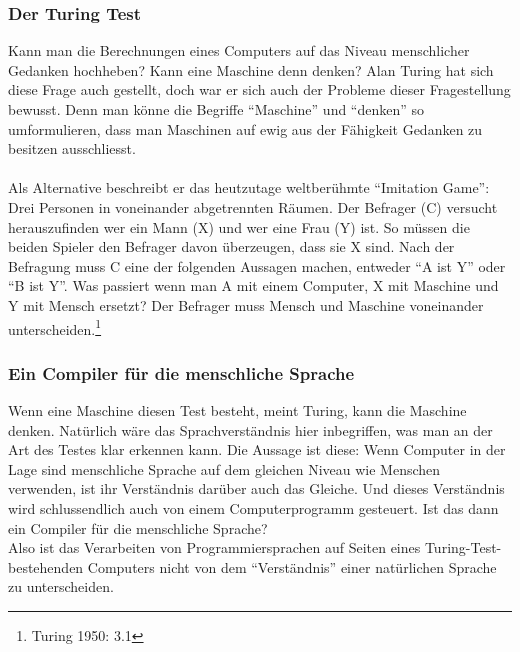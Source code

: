 \documentclass[10pt,a4paper]{article}
\begin{document}
\subsubsection{Der Turing Test}
Kann man die Berechnungen eines Computers auf das Niveau menschlicher Gedanken hochheben? Kann eine Maschine denn denken? Alan Turing hat sich diese Frage auch gestellt, doch war er sich auch der Probleme dieser Fragestellung bewusst. Denn man könne die Begriffe \enquote{Maschine} und \enquote{denken} so umformulieren, dass man Maschinen auf ewig aus der Fähigkeit Gedanken zu besitzen ausschliesst.\\
\\
Als Alternative beschreibt er das heutzutage weltberühmte \enquote{Imitation Game}:
Drei Personen in voneinander abgetrennten Räumen. Der Befrager (C) versucht herauszufinden wer ein Mann (X) und wer eine Frau (Y) ist. So müssen die beiden Spieler den Befrager davon überzeugen, dass sie X sind. Nach der Befragung muss C eine der folgenden Aussagen machen, entweder \enquote{A ist Y} oder \enquote{B ist Y}. Was passiert wenn man A mit einem Computer, X mit Maschine und Y mit Mensch ersetzt? Der Befrager muss Mensch und Maschine voneinander unterscheiden.\footnote{Turing 1950: 3.1} \\

\subsubsection{Ein Compiler für die menschliche Sprache}
Wenn eine Maschine diesen Test besteht, meint Turing, kann die Maschine denken. Natürlich wäre das Sprachverständnis hier inbegriffen, was man an der Art des Testes klar erkennen kann. Die Aussage ist diese: Wenn Computer in der Lage sind menschliche Sprache auf dem gleichen Niveau wie Menschen verwenden, ist ihr Verständnis darüber auch das Gleiche. Und dieses Verständnis wird schlussendlich auch von einem Computerprogramm gesteuert. Ist das dann ein Compiler für die menschliche Sprache? \\
Also ist das Verarbeiten von Programmiersprachen auf Seiten eines Turing-Test-bestehenden Computers nicht von dem \enquote{Verständnis} einer natürlichen Sprache zu unterscheiden. \\
\end{document}
